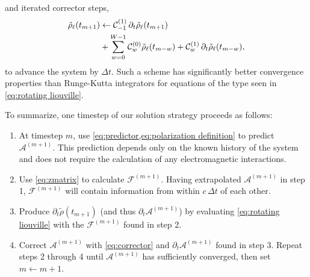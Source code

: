 and iterated corrector steps,
\begin{equation}
  \begin{aligned}
    \tilde{\rho}_\ell(t_{m + 1}) &\leftarrow \mathcal{C}_{-1}^{\qty(1)} \, \partial_t \tilde{\rho}_\ell(t_{m+1}) \\
                                 &+ \sum_{w = 0}^{W - 1} \mathcal{C}_w^{\qty(0)} \tilde{\rho}_\ell(t_{m-w}) + \mathcal{C}_w^{\qty(1)} \, \partial_t \tilde{\rho}_\ell(t_{m-w}),
  \end{aligned}
  \label{eq:corrector}
\end{equation}
to advance the system by $\Delta t$.
Such a scheme has significantly better convergence properties than Runge-Kutta integrators for equations of the type seen in \cref{eq:rotating liouville}.

To summarize, one timestep of our solution strategy proceeds as follows:
\begin{enumerate}
  \item At timestep $m$, use \cref{eq:predictor,eq:polarization definition} to predict $\mathcal{A}^{(m + 1)}$.
    This prediction depends only on the known history of the system and does not require the calculation of any electromagnetic interactions.
  \item Use \cref{eq:zmatrix} to calculate $\mathcal{F}^{(m + 1)}$.
    Having extrapolated $\mathcal{A}^{(m + 1)}$ in step 1, $\mathcal{F}^{(m + 1)}$ will contain information from \qds{} within $c \, \Delta t$ of each other.
  \item Produce $\partial_t \tilde{\rho}(t_{m + 1})$ (and thus $\partial_t \mathcal{A}^{(m + 1)}$) by evaluating \cref{eq:rotating liouville} with the $\mathcal{F}^{(m+1)}$ found in step 2.
  \item Correct $\mathcal{A}^{(m + 1)}$ with \cref{eq:corrector} and $\partial_t \mathcal{A}^{(m + 1)}$ found in step 3.
    Repeat steps 2 through 4 until $\mathcal{A}^{(m + 1)}$ has sufficiently converged, then set $m \leftarrow m + 1$.
\end{enumerate}
